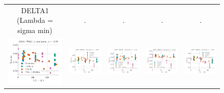 \begin{figure}
\begin{tabular}{@{\hskip -0.0in}c@{\hskip -0.0in}c@{\hskip -0.0in}c@{\hskip -0.0in}c@{\hskip -0.0in}c@{\hskip -0.0in}}
		DELTA1 (Lambda = sigma min) & . & . & . & .\\
		\includegraphics[width=.2\linewidth]{figures/glove400k_sentiment_mr_test-acc_vs_gram-large-dim-delta1-2-trans_linx.pdf} &
		\includegraphics[width=.2\linewidth]{figures/glove400k_sentiment_subj_test-acc_vs_gram-large-dim-delta1-2-trans_linx.pdf} &
		\includegraphics[width=.2\linewidth]{figures/glove400k_sentiment_cr_test-acc_vs_gram-large-dim-delta1-2-trans_linx.pdf} &
		\includegraphics[width=.2\linewidth]{figures/glove400k_sentiment_sst_test-acc_vs_gram-large-dim-delta1-2-trans_linx.pdf} &
		\includegraphics[width=.2\linewidth]{figures/glove400k_sentiment_mpqa_test-acc_vs_gram-large-dim-delta1-2-trans_linx.pdf} \\
		

\end{tabular}
\end{figure}
